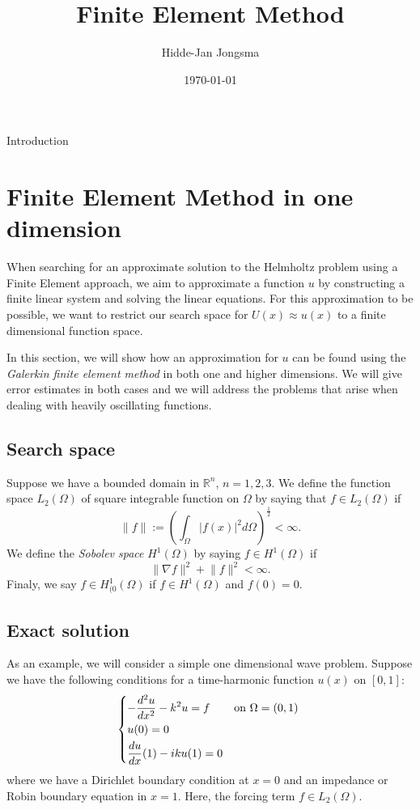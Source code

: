 \documentclass[a4paper]{article}
\author{Hidde-Jan Jongsma}
\title{Finite Element Method}
\date{\today}
\newcommand{\Reals}{\mathbb{R}}
\newcommand{\LO}{\ensuremath{L_2(\Omega)}}
\newcommand{\HO}{\ensuremath{H^1(\Omega)}}
\newcommand{\HOzero}{\ensuremath{H^1_{(0}(\Omega)}}
\begin{document}
Introduction

\section{Finite Element Method in one dimension}

When searching for an approximate solution to the Helmholtz problem
using a Finite Element approach, we aim to approximate a function
$u$ by constructing a finite linear system and solving the linear
equations. For this approximation to be possible, we want to
restrict our search space for $U(x) \approx u(x)$ to a finite dimensional
function space.

In this section, we will show how an approximation for $u$ can be found
using the \emph{Galerkin finite element method} in both
one and higher dimensions. We will give error estimates in both
cases and we will address the problems that arise when
dealing with heavily oscillating functions.

\subsection{Search space}

Suppose we have a bounded domain in $\Reals^n$, $n = 1, 2, 3$.
We define the function space $\LO$ of square integrable
function on $\Omega$ by saying that $f \in \LO$ if
\begin{equation}
  \lVert f \rVert := \left( \int_\Omega | f(x) |^2 d\Omega \right)^{\frac{1}{2}} < \infty.
\end{equation}
We define the \emph{Sobolev space} $\HO$ by saying $f \in \HO$ if
\begin{equation}
  \lVert \nabla f \rVert^2 + \lVert f \rVert^2 < \infty.
\end{equation}
Finaly, we say $f \in \HOzero$ if $f \in \HO$ and $f(0) = 0$.

\subsection{Exact solution}

As an example, we will consider a simple one dimensional wave
problem. Suppose we have the following conditions for
a time-harmonic function $u(x)$ on $[0, 1]$:
\begin{equation}
  \begin{dcases*}
    - \frac{d^2u}{dx^2} - k^2 u = f & on $\Omega = (0, 1)$ \\
    u(0) = 0 \label{eq:dirbc} & \\
    \frac{du}{dx}(1) - i k u(1) = 0 \label{eq:impbc} &
  \end{dcases*}
\end{equation}
where we have a Dirichlet boundary condition at $x = 0$ and
an impedance or Robin boundary equation in $x = 1$.
Here, the forcing term $f \in \LO$.
\end{document}

